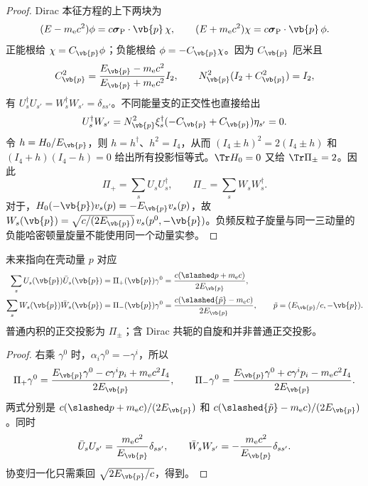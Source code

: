 \begin{proof}
Dirac 本征方程的上下两块为
\begin{equation*}
 (E-m_{\mathrm e}c^2)\phi=c\boldsymbol\sigma_{\rm P}\cdot\vb{p}\,\chi,
 \qquad
 (E+m_{\mathrm e}c^2)\chi=c\boldsymbol\sigma_{\rm P}\cdot\vb{p}\,\phi.
\end{equation*}
正能根给 $\chi=C_{\vb{p}}\phi$；负能根给 $\phi=-C_{\vb{p}}\chi$。因为 $C_{\vb{p}}$ 厄米且
\begin{equation*}
 C_{\vb{p}}^2=
 \frac{E_{\vb{p}}-m_{\mathrm e}c^2}{E_{\vb{p}}+m_{\mathrm e}c^2}I_2,
 \qquad N_{\vb{p}}^2(I_2+C_{\vb{p}}^2)=I_2,
\end{equation*}
有 $U_s^\dagger U_{s'}=W_s^\dagger W_{s'}=\delta_{ss'}$。不同能量支的正交性也直接给出
\begin{equation*}
 U_s^\dagger W_{s'}=N_{\vb{p}}^2\xi_s^\dagger(-C_{\vb{p}}+C_{\vb{p}})\eta_{s'}=0.
\end{equation*}
令 $h=H_0/E_{\vb{p}}$，则 $h=h^\dagger$、$h^2=I_4$，从而 $(I_4\pm h)^2=2(I_4\pm h)$ 和 $(I_4+h)(I_4-h)=0$ 给出所有投影恒等式。$\Tr H_0=0$ 又给 $\Tr\Pi_\pm=2$。因此
\begin{equation*}
 \Pi_+=\sum_sU_sU_s^\dagger,
 \qquad \Pi_-=\sum_sW_sW_s^\dagger.
\end{equation*}
对于，$H_0(-\vb{p})v_s(p)=-E_{\vb{p}}v_s(p)$，故 $W_s(\vb{p})=\sqrt{c/(2E_{\vb{p}})}\,v_s(p^0,-\vb{p})$。负频反粒子旋量与同一三动量的负能哈密顿量旋量不能使用同一个动量实参。
\end{proof}

\begin{proposition}[协变自旋和与概率投影的换算]
未来指向在壳动量 $p$ 对应
\begin{align}
 \sum_sU_s(\vb{p})\bar U_s(\vb{p})
 &=\Pi_+(\vb{p})\gamma^0
 =\frac{c(\slashed p+m_{\mathrm e}c)}{2E_{\vb{p}}},
 \label{eq:feqo-probability-spin-sum}\\
 \sum_sW_s(\vb{p})\bar W_s(\vb{p})
 &=\Pi_-(\vb{p})\gamma^0
 =\frac{c(\slashed{\tilde p}-m_{\mathrm e}c)}{2E_{\vb{p}}},
 \qquad \tilde p=(E_{\vb{p}}/c,-\vb{p}).
 \label{eq:feqo-negative-probability-spin-sum}
\end{align}
普通内积的正交投影为 $\Pi_\pm$；含 Dirac 共轭的自旋和并非普通正交投影。
\end{proposition}

\begin{proof}
右乘 $\gamma^0$ 时，$\alpha_i\gamma^0=-\gamma^i$，所以
\begin{equation*}
 \Pi_+\gamma^0=\frac{E_{\vb{p}}\gamma^0-c\gamma^ip_i+m_{\mathrm e}c^2I_4}{2E_{\vb{p}}},
 \qquad
 \Pi_-\gamma^0=\frac{E_{\vb{p}}\gamma^0+c\gamma^ip_i-m_{\mathrm e}c^2I_4}{2E_{\vb{p}}}.
\end{equation*}
两式分别是 $c(\slashed p+m_{\mathrm e}c)/(2E_{\vb{p}})$ 和 $c(\slashed{\tilde p}-m_{\mathrm e}c)/(2E_{\vb{p}})$。同时
\begin{equation*}
 \bar U_sU_{s'}=\frac{m_{\mathrm e}c^2}{E_{\vb{p}}}\delta_{ss'},
 \qquad
 \bar W_sW_{s'}=-\frac{m_{\mathrm e}c^2}{E_{\vb{p}}}\delta_{ss'}.
\end{equation*}
协变归一化只需乘回 $\sqrt{2E_{\vb{p}}/c}$，得到。
\end{proof}

